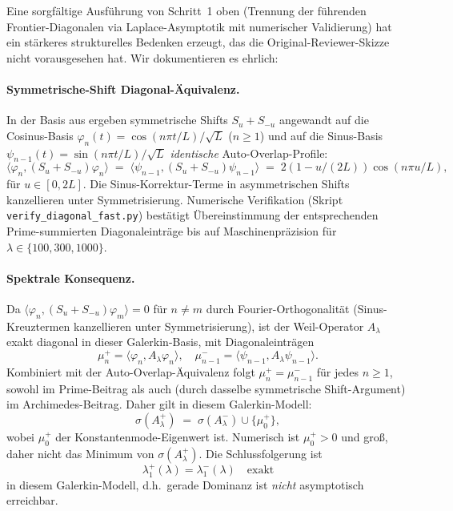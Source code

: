 \documentclass[11pt,a4paper]{article}
\theoremstyle{remark}
\theoremstyle{plain}
\begin{document}
Eine sorgfältige Ausführung von Schritt~1 oben (Trennung der führenden Frontier-Diagonalen via Laplace-Asymptotik mit numerischer Validierung) hat ein stärkeres strukturelles Bedenken erzeugt, das die Original-Reviewer-Skizze nicht vorausgesehen hat. Wir dokumentieren es ehrlich:

\paragraph{Symmetrische-Shift Diagonal-Äquivalenz.} In der Basis aus  ergeben symmetrische Shifts $S_u + S_{-u}$ angewandt auf die Cosinus-Basis $\varphi_n(t) = \cos(n\pi t/L)/\sqrt L$ ($n\geq 1$) und auf die Sinus-Basis $\psi_{n-1}(t) = \sin(n\pi t/L)/\sqrt L$ \emph{identische} Auto-Overlap-Profile:
\[
  \langle\varphi_n, (S_u+S_{-u})\varphi_n\rangle
  \;=\; \langle\psi_{n-1}, (S_u+S_{-u})\psi_{n-1}\rangle
  \;=\; 2(1 - u/(2L))\cos(n\pi u/L),
\]
für $u \in [0, 2L]$. Die Sinus-Korrektur-Terme in asymmetrischen Shifts kanzellieren unter Symmetrisierung. Numerische Verifikation (Skript \texttt{verify\_diagonal\_fast.py}) bestätigt Übereinstimmung der entsprechenden Prime-summierten Diagonaleinträge bis auf Maschinenpräzision für $\lambda \in \{100, 300, 1000\}$.

\paragraph{Spektrale Konsequenz.} Da $\langle\varphi_n, (S_u+S_{-u})\varphi_m\rangle = 0$ für $n\neq m$ durch Fourier-Orthogonalität (Sinus-Kreuztermen kanzellieren unter Symmetrisierung), ist der Weil-Operator $A_\lambda$ exakt diagonal in dieser Galerkin-Basis, mit Diagonaleinträgen
\[
  \mu^+_n = \langle\varphi_n, A_\lambda\varphi_n\rangle,
  \quad
  \mu^-_{n-1} = \langle\psi_{n-1}, A_\lambda\psi_{n-1}\rangle.
\]
Kombiniert mit der Auto-Overlap-Äquivalenz folgt $\mu^+_n = \mu^-_{n-1}$ für jedes $n \geq 1$, sowohl im Prime-Beitrag als auch (durch dasselbe symmetrische Shift-Argument) im Archimedes-Beitrag. Daher gilt in diesem Galerkin-Modell:
\[
  \sigma(A_\lambda^+) \;=\; \sigma(A_\lambda^-) \cup \{\mu^+_0\},
\]
wobei $\mu^+_0$ der Konstantenmode-Eigenwert ist. Numerisch ist $\mu^+_0 > 0$ und groß, daher nicht das Minimum von $\sigma(A_\lambda^+)$. Die Schlussfolgerung ist
\[
  \lambda_1^+(\lambda) = \lambda_1^-(\lambda) \quad\text{exakt}
\]
in diesem Galerkin-Modell, d.h.\ gerade Dominanz ist \emph{nicht} asymptotisch erreichbar.
\end{document}
